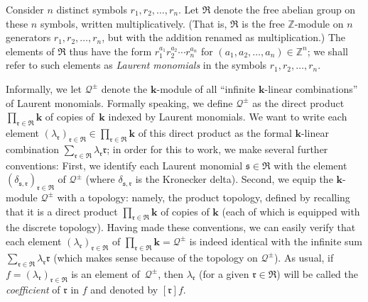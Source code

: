 \documentclass[11pt]{article}
\numberwithin{equation}{section}
\let\sumnonlimits\sum
\let\prodnonlimits\prod
\renewcommand{\sum}{\sumnonlimits\limits}
\renewcommand{\prod}{\prodnonlimits\limits}
\begin{document}
\begin{Definition} \label{def.Qbig}Consider $n$ distinct symbols $r_{1},r_{2},\ldots,r_{n}$. Let $\mathfrak{R}$ denote the free abelian group on these $n$ symbols, written multiplicatively. (That is, $\mathfrak{R}$ is the free $\mathbb{Z}$-module on $n$ generators $r_{1},r_{2},\ldots,r_{n}$, but with the addition renamed as multiplication.) The elements of $\mathfrak{R}$ thus have the form $r_{1}^{a_{1}}r_{2}^{a_{2}}\cdots r_{n}^{a_{n}}$ for $( a_{1},a_{2},\ldots,a_{n}) \in\mathbb{Z}^{n}$; we shall refer to such elements as \textit{Laurent monomials} in the symbols $r_{1},r_{2},\ldots,r_{n}$.

Informally, we let $\mathcal{Q}^{\pm}$ denote the $\mathbf{k}$-module of all ``infinite $\mathbf{k}$-linear combinations'' of Laurent monomials. Formally speaking, we define $\mathcal{Q}^{\pm}$ as the direct product $\prod_{\mathfrak{r}\in\mathfrak{R}}\mathbf{k}$ of copies of~$\mathbf{k}$ indexed by Laurent monomials. We want to write each element $ ( \lambda_{\mathfrak{r}}) _{\mathfrak{r}\in\mathfrak{R}}\in \prod_{\mathfrak{r}\in\mathfrak{R}}\mathbf{k}$ of this direct product as the formal $\mathbf{k}$-linear combination $\sum_{\mathfrak{r}\in\mathfrak{R}}\lambda_{\mathfrak{r}}\mathfrak{r}$; in order for this to work, we make
several further conventions: First, we identify each Laurent monomial $\mathfrak{s}\in\mathfrak{R}$ with the element $( \delta_{\mathfrak{s},\mathfrak{r}}) _{\mathfrak{r}\in\mathfrak{R}}$ of $\mathcal{Q}^{\pm}$ (where $\delta_{\mathfrak{s},\mathfrak{r}}$ is the Kronecker delta). Second, we equip the $\mathbf{k}$-module $\mathcal{Q}^{\pm}$ with a topology: namely, the product topology, defined by recalling that it is a direct product
$\prod_{\mathfrak{r}\in\mathfrak{R}}\mathbf{k}$ of copies of $\mathbf{k}$ (each of which is equipped with the discrete topology). Having made these conventions, we can easily verify that each element $( \lambda_{\mathfrak{r}}) _{\mathfrak{r}\in\mathfrak{R}}$ of $\prod_{\mathfrak{r}\in\mathfrak{R}}\mathbf{k}=\mathcal{Q}^{\pm}$ is indeed identical with the infinite sum $\sum_{\mathfrak{r}\in\mathfrak{R}}\lambda_{\mathfrak{r}}\mathfrak{r}$ (which makes sense because of the topology on $\mathcal{Q}^{\pm}$). As usual, if $f= ( \lambda_{\mathfrak{r}} ) _{\mathfrak{r}\in\mathfrak{R}}$ is an element of~$\mathcal{Q}^{\pm}$, then $\lambda_{\mathfrak{r}}$ (for a given $\mathfrak{r}\in\mathfrak{R}$) will be called the \textit{coefficient} of $\mathfrak{r}$ in $f$ and denoted by $ [ \mathfrak{r} ] f$.
\end{Definition}
\end{document}
